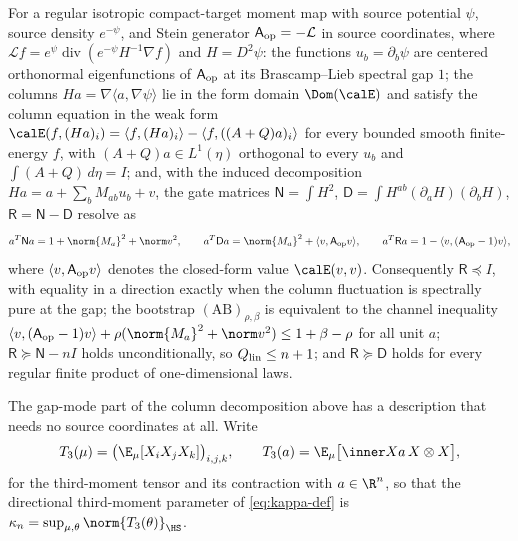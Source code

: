 \documentclass[../../main.tex]{subfiles}
\begin{document}
\begin{lemma}
\label{lem:cmh-linear-spectral-resolution}
For a regular isotropic compact-target moment map with source potential $\psi$, source density
$e^{-\psi}$, and Stein generator $\mathsf A_{\rm op}=-\mathcal L$ in source coordinates, where
$\mathcal Lf=e^{\psi}\operatorname{div}(e^{-\psi}H^{-1}\nabla f)$ and $H=D^2\psi$: the
functions $u_b=\partial_b\psi$ are centered orthonormal eigenfunctions of $\mathsf A_{\rm op}$
at its Brascamp--Lieb spectral gap $1$; the columns $Ha=\nabla\langle a,\nabla\psi\rangle$ lie
in the form domain $\Dom(\calE)$ and satisfy the column equation in the weak form
$\calE(f,(Ha)_i)=\langle f,(Ha)_i\rangle-\langle f,((A+Q)a)_i\rangle$ for every bounded smooth
finite-energy $f$, with $(A+Q)a\in L^1(\eta)$ orthogonal to every $u_b$ and
$\int(A+Q)\,d\eta=I$; and, with the induced decomposition
$Ha=a+\sum_bM_{ab}u_b+v$, the gate matrices $\mathsf N=\int H^2$,
$\mathsf D=\int H^{ab}(\partial_aH)(\partial_bH)$, $\mathsf R=\mathsf N-\mathsf D$ resolve as
\[
  a^T\mathsf Na=1+\norm{M_a}^2+\norm v^2,\qquad
  a^T\mathsf Da=\norm{M_a}^2+\langle v,\mathsf A_{\rm op}v\rangle,\qquad
  a^T\mathsf Ra=1-\langle v,(\mathsf A_{\rm op}-1)v\rangle ,
\]
where $\langle v,\mathsf A_{\rm op}v\rangle$ denotes the closed-form value $\calE(v,v)$.
Consequently $\mathsf R\preceq I$, with equality in a direction exactly when the column
fluctuation is spectrally pure at the gap; the bootstrap $(\mathrm{AB})_{\rho,\beta}$ is
equivalent to the channel inequality
$\langle v,(\mathsf A_{\rm op}-1)v\rangle+\rho(\norm{M_a}^2+\norm v^2)\le1+\beta-\rho$ for all
unit $a$; $\mathsf R\succeq\mathsf N-nI$ holds unconditionally, so $Q_{\rm lin}\le n+1$; and
$\mathsf R\succeq\mathsf D$ holds for every regular finite product of one-dimensional laws.
\end{lemma}

The gap-mode part of the column decomposition above has a description that needs no source
coordinates at all. Write
\[
  T_3(\mu)=\bigl(\E_\mu[X_iX_jX_k]\bigr)_{i,j,k},
  \qquad
  T_3(a)=\E_\mu\bigl[\inner Xa\,X\otimes X\bigr],
\]
for the third-moment tensor and its contraction with $a\in\R^n$, so that the directional
third-moment parameter of \eqref{eq:kappa-def} is $\kappa_n=\sup_{\mu,\theta}\norm{T_3(\theta)}_{\HS}$.
\end{document}
